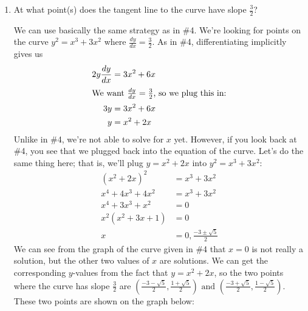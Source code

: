 \documentclass[main]{subfiles}
\begin{document}
\begin{enumerate}[resume]
\begin{enumerate}
\item
  \begin{problem}[\vfill]
    At what point(s) does
    the tangent line to the curve have slope $\frac{3}{2}$? 
  \end{problem}

  \begin{solution} 
    We can use basically the same strategy as in
    {{\#4}}.  We're looking for
    points on the curve $y^2 = x^3 + 3x^2$ where $\frac{dy}{dx} =
    \frac{3}{2}$.  As in {{\#4}},
    differentiating implicitly gives us
    \begin{align*}
      2y \frac{dy}{dx} &= 3x^2 + 6x \\
      \shortintertext{We want $\frac{dy}{dx} = \frac{3}{2}$, so we plug
        this in:} %
      3y &= 3x^2 + 6x \\
      y &= x^2 + 2x
    \end{align*}
    Unlike in {{\#4}}, we're not
    able to solve for $x$ yet.  However, if you look back at
    {{\#4}}, you see that we plugged
    back into the equation of the curve.  Let's do the same thing here;
    that is, we'll plug $y = x^2 + 2x$ into $y^2 = x^3 + 3x^2$:
    \begin{align*}
      (x^2 + 2x)^2 &= x^3 + 3x^2 \\
      x^4 + 4x^3 + 4x^2 &= x^3 + 3x^2 \\
      x^4 + 3x^3 + x^2 &= 0 \\
      x^2 (x^2 + 3x + 1) &= 0 \\
      x &= 0, \frac{-3 \pm \sqrt{5}}{2}
    \end{align*}
    We can see from the graph of the curve given in
    {{\#4}} that $x = 0$ is not
    really a solution, but the other two values of $x$ are solutions.  We
    can get the corresponding $y$-values from the fact that $y = x^2 +
    2x$, so the two points where the curve has slope $\frac{3}{2}$ are
    $\boxed{\left( \frac{-3 - \sqrt{5}}{2}, \frac{1 + \sqrt{5}}{2} \right)
      \text{ and } \left( \frac{-3 + \sqrt{5}}{2}, \frac{1 - \sqrt{5}}{2}
      \right)}$.  These two points are shown on the graph below:
    \begin{center}
    \end{center}
  \end{solution}


\end{enumerate}
\end{enumerate}
\end{document}
